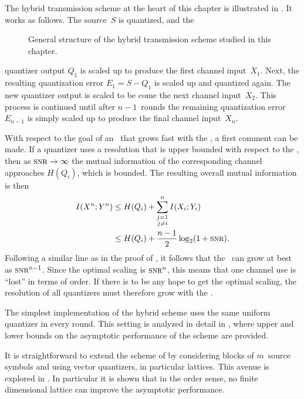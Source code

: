 The hybrid transmission scheme at the heart of this chapter is illustrated in
. It works as follows. The source~$S$ is quantized, and the
\begin{figure}[tbp]
  \begin{center}
    
  \end{center}
  \caption{General structure of the hybrid transmission scheme studied in this
  chapter.}
  \label{fig:qeschemegen}
\end{figure}
quantizer output $Q_1$ is scaled up to produce the first channel input~$X_1$.
Next, the resulting quantization error $E_1 = S - Q_1$ is scaled up and
quantized again. The new quantizer output is scaled to be come the next channel
input~$X_2$. This process is continued until after $n-1$~rounds the remaining
quantization error~$E_{n-1}$ is simply scaled up to produce the final channel
input~$X_n$. 

With respect to the goal of an \sdr\ that grows fast with the \snr, a first
comment can be made. If a quantizer uses a resolution that is upper
bounded with respect to the \snr, then as $\snr \goesto \infty$ the mutual
information of the corresponding channel approaches $H(Q_i)$, which is bounded.
The resulting overall mutual information is then
\begin{align*}
  I(X^n; Y^n) &\le H(Q_i) + \sum_{\substack{j = 1 \\ j \ne i}}^n I(X_i; Y_i) \\
  &\le H(Q_i) + \frac{n-1}{2} \log_2(1 + \snr).
\end{align*}
Following a similar line as in the proof of , it follows that the
\sdr\ can grow at best as $\snr^{n-1}$. Since the optimal scaling is $\snr^n$,
this means that one channel use is ``lost'' in terms of order.  If there is to
be any hope to get the optimal scaling, the resolution of all quantizers must
therefore grow with the \snr.

The simplest implementation of the hybrid scheme uses the same uniform quantizer
in every round. This setting is analyzed in detail in ,
where upper and lower bounds on the asymptotic performance of the scheme are
provided. 

It is straightforward to extend the scheme of  by
considering blocks of $m$~source symbols and using vector quantizers, in
particular lattices. This avenue is explored in . In
particular it is shown that in the order sense, no finite dimensional lattice
can improve the asymptotic performance. 

